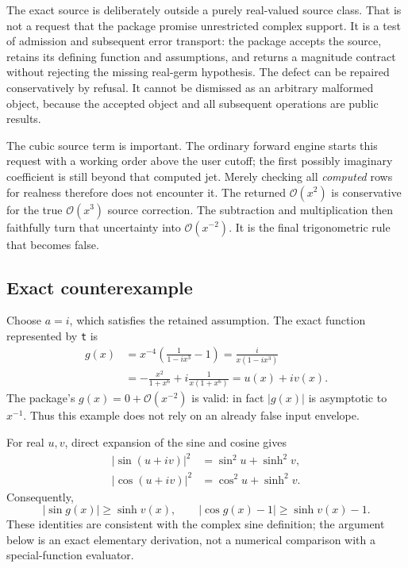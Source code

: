 \documentclass[11pt,a4paper]{article}
\newcommand{\OO}{\mathcal O}
\begin{document}
The exact source is deliberately outside a purely real-valued source class. That is not a request that the package promise unrestricted complex support. It is a test of admission and subsequent error transport: the package accepts the source, retains its defining function and assumptions, and returns a magnitude contract without rejecting the missing real-germ hypothesis. The defect can be repaired conservatively by refusal. It cannot be dismissed as an arbitrary malformed object, because the accepted object and all subsequent operations are public results.

The cubic source term is important. The ordinary forward engine starts this request with a working order above the user cutoff; the first possibly imaginary coefficient is still beyond that computed jet. Merely checking all \emph{computed} rows for realness therefore does not encounter it. The returned $\OO(x^2)$ is conservative for the true $\OO(x^3)$ source correction. The subtraction and multiplication then faithfully turn that uncertainty into $\OO(x^{-2})$. It is the final trigonometric rule that becomes false.\cite{core,ops,arithmetic,envelope}

\subsection{Exact counterexample}
Choose $a=i$, which satisfies the retained assumption. The exact function represented by \texttt{t} is
\begin{align}
g(x)&=x^{-4}\left(\frac1{1-i x^3}-1\right)
 =\frac{i}{x(1-i x^3)}\\
&=-\frac{x^2}{1+x^6}
  +i\frac1{x(1+x^6)}
 =u(x)+iv(x).
\label{eq:g}
\end{align}
The package's $g(x)=0+\OO(x^{-2})$ is valid: in fact $|g(x)|$ is asymptotic to $x^{-1}$. Thus this example does not rely on an already false input envelope.

For real $u,v$, direct expansion of the sine and cosine gives
\begin{align}
|\sin(u+iv)|^2&=\sin^2u+\sinh^2v,\label{eq:sincomplex}\\
|\cos(u+iv)|^2&=\cos^2u+\sinh^2v.
\end{align}
Consequently,
\[
 |\sin g(x)|\ge\sinh v(x),\qquad
 |\cos g(x)-1|\ge\sinh v(x)-1.
\]
These identities are consistent with the complex sine definition; the argument below is an exact elementary derivation, not a numerical comparison with a special-function evaluator.\cite{sin}
\end{document}
